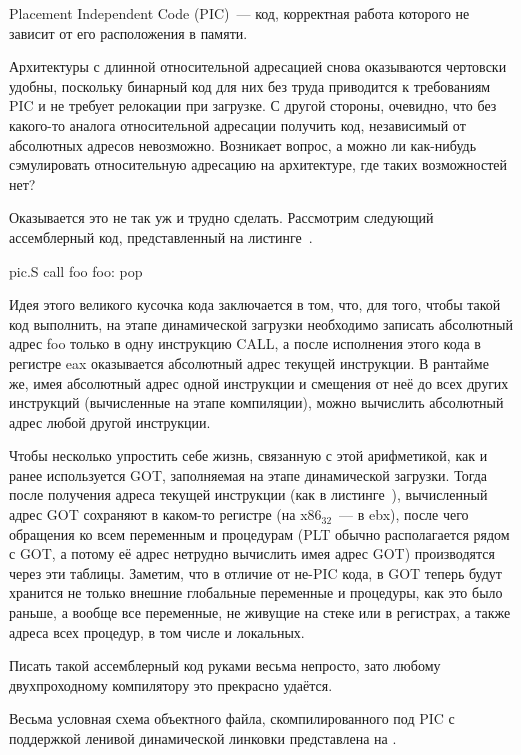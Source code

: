 \begin{definition}
Placement Independent Code (PIC)~--- код, корректная работа которого не зависит от его расположения в памяти.
\end{definition}

Архитектуры с длинной относительной адресацией снова оказываются чертовски удобны, поскольку бинарный код для них без труда приводится к требованиям PIC и не требует релокации при загрузке.
С другой стороны, очевидно, что без какого-то аналога относительной адресации получить код, независимый от абсолютных адресов невозможно.
Возникает вопрос, а можно ли как-нибудь сэмулировать относительную адресацию на архитектуре, где таких возможностей нет?

Оказывается это не так уж и трудно сделать.
Рассмотрим следующий ассемблерный код, представленный на листинге~.

\begin{asmcode}{pic.S}
call foo
foo:
pop %
\end{asmcode}

Идея этого великого кусочка кода заключается в том, что, для того, чтобы такой код выполнить, на этапе динамической загрузки необходимо записать абсолютный адрес foo только в одну инструкцию CALL, а после исполнения этого кода в регистре eax оказывается абсолютный адрес текущей инструкции.
В рантайме же, имея абсолютный адрес одной инструкции и смещения от неё до всех других инструкций (вычисленные на этапе компиляции), можно вычислить абсолютный адрес любой другой инструкции.

Чтобы несколько упростить себе жизнь, связанную с этой арифметикой, как и ранее используется GOT, заполняемая на этапе динамической загрузки.
Тогда после получения адреса текущей инструкции (как в листинге~), вычисленный адрес GOT сохраняют в каком-то регистре (на x$86_{32}$~--- в ebx), после чего обращения ко всем переменным и процедурам (PLT обычно располагается рядом с GOT, а потому её адрес нетрудно вычислить имея адрес GOT) производятся через эти таблицы.
Заметим, что в отличие от не-PIC кода, в GOT теперь будут хранится не только внешние глобальные переменные и процедуры, как это было раньше, а вообще все переменные, не живущие на стеке или в регистрах, а также адреса всех процедур, в том числе и локальных.

Писать такой ассемблерный код руками весьма непросто, зато любому двухпроходному компилятору это прекрасно удаётся.

Весьма условная схема объектного файла, скомпилированного под PIC с поддержкой ленивой динамической линковки представлена на .

